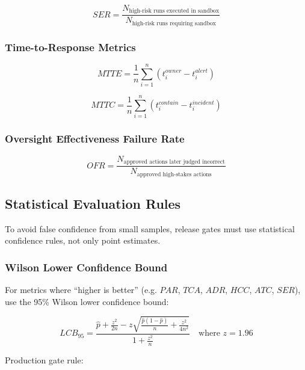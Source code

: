 \documentclass[11pt,a4paper]{article}
\begin{document}
\begin{equation}
SER = \frac{N_{\text{high-risk runs executed in sandbox}}}{N_{\text{high-risk runs requiring sandbox}}}
\end{equation}

\subsubsection{Time-to-Response Metrics}

\begin{equation}
MTTE = \frac{1}{n}\sum_{i=1}^{n}(t^{owner}_i - t^{alert}_i)
\end{equation}

\begin{equation}
MTTC = \frac{1}{n}\sum_{i=1}^{n}(t^{contain}_i - t^{incident}_i)
\end{equation}

\subsubsection{Oversight Effectiveness Failure Rate}

\begin{equation}
OFR = \frac{N_{\text{approved actions later judged incorrect}}}{N_{\text{approved high-stakes actions}}}
\end{equation}

\subsection{Statistical Evaluation Rules}

To avoid false confidence from small samples, release gates must use statistical confidence rules, not only point estimates.

\subsubsection{Wilson Lower Confidence Bound}

For metrics where ``higher is better'' (e.g. \(PAR\), \(TCA\), \(ADR\), \(HCC\), \(ATC\), \(SER\)), use the 95\% Wilson lower confidence bound:

\begin{equation}
LCB_{95} =
\frac{
\hat p + \frac{z^2}{2n} - z\sqrt{\frac{\hat p(1-\hat p)}{n} + \frac{z^2}{4n^2}}
}{
1 + \frac{z^2}{n}
}
\quad \text{where } z = 1.96
\end{equation}

Production gate rule:
\end{document}
